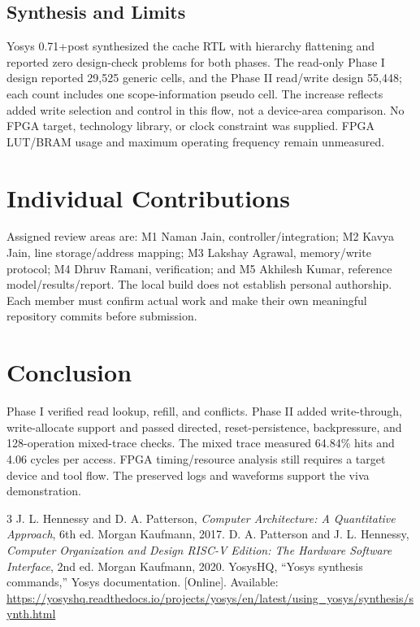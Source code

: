 \documentclass[conference]{IEEEtran}
\begin{document}
\subsection{Synthesis and Limits}
Yosys 0.71+post synthesized the cache RTL with hierarchy flattening and reported zero design-check problems for both phases. The read-only Phase I design reported 29,525 generic cells, and the Phase II read/write design 55,448; each count includes one scope-information pseudo cell. The increase reflects added write selection and control in this flow, not a device-area comparison. No FPGA target, technology library, or clock constraint was supplied. FPGA LUT/BRAM usage and maximum operating frequency remain unmeasured.

\balance
\section{Individual Contributions}
Assigned review areas are: M1 Naman Jain, controller/integration; M2 Kavya Jain, line storage/address mapping; M3 Lakshay Agrawal, memory/write protocol; M4 Dhruv Ramani, verification; and M5 Akhilesh Kumar, reference model/results/report. The local build does not establish personal authorship. Each member must confirm actual work and make their own meaningful repository commits before submission.

\section{Conclusion}
Phase I verified read lookup, refill, and conflicts. Phase II added write-through, write-allocate support and passed directed, reset-persistence, backpressure, and 128-operation mixed-trace checks. The mixed trace measured 64.84\% hits and 4.06 cycles per access. FPGA timing/resource analysis still requires a target device and tool flow. The preserved logs and waveforms support the viva demonstration.

\begin{thebibliography}{3}
 J. L. Hennessy and D. A. Patterson, \emph{Computer Architecture: A Quantitative Approach}, 6th ed. Morgan Kaufmann, 2017.
 D. A. Patterson and J. L. Hennessy, \emph{Computer Organization and Design RISC-V Edition: The Hardware Software Interface}, 2nd ed. Morgan Kaufmann, 2020.
 YosysHQ, ``Yosys synthesis commands,'' Yosys documentation. [Online]. Available: \url{https://yosyshq.readthedocs.io/projects/yosys/en/latest/using_yosys/synthesis/synth.html}
\end{thebibliography}
\end{document}
